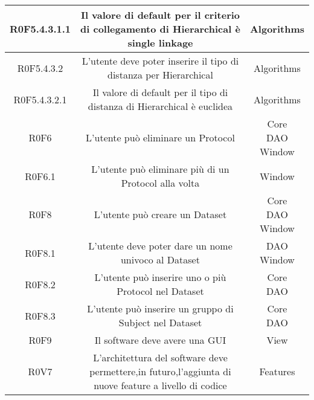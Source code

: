\begin{center}
\begin{longtable}{|c|c|c|}
\hline
R0F5.4.3.1.1   & \parbox[t]{\larghezza}{Il valore di default per il criterio di collegamento di Hierarchical\glossario{} è single linkage}  & \parbox[t]{\dimFonti}{ Algorithms \\} \\
\hline
R0F5.4.3.2   & \parbox[t]{\larghezza}{L'utente deve poter inserire il tipo di distanza per Hierarchical}  & \parbox[t]{\dimFonti}{ Algorithms \\} \\
\hline
R0F5.4.3.2.1   & \parbox[t]{\larghezza}{Il valore di default per il tipo di distanza di Hierarchical è euclidea}  & \parbox[t]{\dimFonti}{ Algorithms \\} \\
\hline
R0F6   & \parbox[t]{\larghezza}{L'utente può eliminare un Protocol}  & \parbox[t]{\dimFonti}{ Core \\ DAO \\ Window \\} \\
\hline
R0F6.1   & \parbox[t]{\larghezza}{L'utente può eliminare più di un Protocol alla volta}  & \parbox[t]{\dimFonti}{ Window \\} \\
\hline
R0F8   & \parbox[t]{\larghezza}{L'utente può creare un Dataset}  & \parbox[t]{\dimFonti}{ Core \\ DAO \\ Window \\} \\
\hline
R0F8.1   & \parbox[t]{\larghezza}{L'utente deve poter dare un nome univoco al Dataset}  & \parbox[t]{\dimFonti}{ DAO \\ Window \\} \\
\hline
R0F8.2   & \parbox[t]{\larghezza}{L'utente può inserire uno o più Protocol nel Dataset}  & \parbox[t]{\dimFonti}{ Core \\ DAO \\} \\
\hline
R0F8.3   & \parbox[t]{\larghezza}{L'utente può inserire un gruppo di Subject nel Dataset }  & \parbox[t]{\dimFonti}{ Core \\ DAO \\} \\
\hline
R0F9   & \parbox[t]{\larghezza}{Il software deve avere una GUI}  & \parbox[t]{\dimFonti}{ View \\} \\
\hline
R0V7   & \parbox[t]{\larghezza}{L'architettura del software deve permettere,in futuro,l'aggiunta di nuove feature a livello di codice}  & \parbox[t]{\dimFonti}{ Features \\} \\

\end{longtable}
\end{center}
